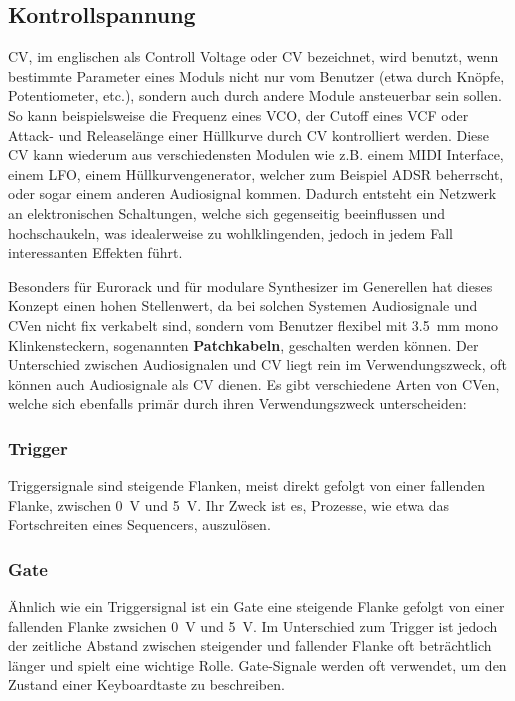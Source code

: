 \subsection{Kontrollspannung \label{CV}}
\label{sec:org40649c5}
\acl{CV}, im englischen als Controll Voltage oder \acs{CV} bezeichnet, wird benutzt, wenn bestimmte Parameter eines Moduls nicht nur vom Benutzer (etwa durch Knöpfe, Potentiometer, etc.), sondern auch durch andere Module ansteuerbar sein sollen. So kann beispielsweise die Frequenz eines \acs{VCO}, der Cutoff eines \ac{VCF} oder Attack- und Releaselänge einer Hüllkurve durch \acl{CV} kontrolliert werden. Diese \acl{CV} kann wiederum aus verschiedensten Modulen wie z.B. einem MIDI Interface, einem \ac{LFO}, einem Hüllkurvengenerator, welcher zum Beispiel \ac{ADSR} beherrscht, oder sogar einem anderen Audiosignal kommen. Dadurch entsteht ein Netzwerk an elektronischen Schaltungen, welche sich gegenseitig beeinflussen und hochschaukeln, was idealerweise zu wohlklingenden, jedoch in jedem Fall interessanten Effekten führt.

Besonders für Eurorack und für modulare Synthesizer im Generellen hat dieses Konzept einen hohen Stellenwert, da bei solchen Systemen Audiosignale und \acl{CV}en nicht fix verkabelt sind, sondern vom Benutzer flexibel mit \SI{3.5}{\milli\meter} mono Klinkensteckern, sogenannten \textbf{Patchkabeln}, geschalten werden können. Der Unterschied zwischen Audiosignalen und \acl{CV} liegt rein im Verwendungszweck, oft können auch Audiosignale als \acl{CV} dienen. Es gibt verschiedene Arten von \acl{CV}en, welche sich ebenfalls primär durch ihren Verwendungszweck unterscheiden:

\subsubsection{Trigger}
\label{sec:orgaaa6448}
Triggersignale sind steigende Flanken, meist direkt gefolgt von einer fallenden Flanke, zwischen \SI{0}{\volt} und \SI{5}{\volt}. Ihr Zweck ist es, Prozesse, wie etwa das Fortschreiten eines Sequencers, auszulösen.

\subsubsection{Gate}
\label{sec:org764ca33}
Ähnlich wie ein Triggersignal ist ein Gate eine steigende Flanke gefolgt von einer fallenden Flanke zwsichen \SI{0}{\volt} und \SI{5}{\volt}. Im Unterschied zum Trigger ist jedoch der zeitliche Abstand zwischen steigender und fallender Flanke oft beträchtlich länger und spielt eine wichtige Rolle. Gate-Signale werden oft verwendet, um den Zustand einer Keyboardtaste zu beschreiben.

